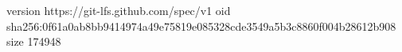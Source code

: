 version https://git-lfs.github.com/spec/v1
oid sha256:0f61a0ab8bb9414974a49e75819e085328cde3549a5b3c8860f004b28612b908
size 174948
